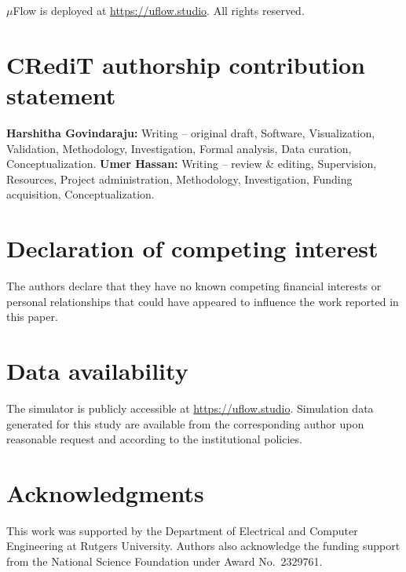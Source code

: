 \documentclass[preprint,review,12pt]{elsarticle}
\begin{document}
$\mu$Flow is deployed at \url{https://uflow.studio}. All rights reserved.


\section*{CRediT authorship contribution statement}

\textbf{Harshitha Govindaraju:} Writing -- original draft, Software, Visualization, Validation, Methodology, Investigation, Formal analysis, Data curation, Conceptualization. \textbf{Umer Hassan:} Writing -- review \& editing, Supervision, Resources, Project administration, Methodology, Investigation, Funding acquisition, Conceptualization.

\section*{Declaration of competing interest}

The authors declare that they have no known competing financial interests or personal relationships that could have appeared to influence the work reported in this paper.

\section*{Data availability}

The simulator is publicly accessible at \url{https://uflow.studio}. Simulation data generated for this study are available from the corresponding author upon reasonable request and according to the institutional policies.

\section*{Acknowledgments}

This work was supported by the Department of Electrical and Computer Engineering at Rutgers University. Authors also acknowledge the funding support from the National Science Foundation under Award No.\ 2329761.



\end{document}
